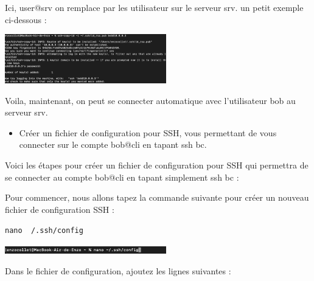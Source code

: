 \documentclass[12pt]{article}
\begin{document}
\vspace{0.3cm}

Ici, user@srv on remplace par les utilisateur sur le serveur srv. un petit exemple ci-dessous  : 

\vspace{0.3cm}

\begin{center}
  \includegraphics[width=7cm]{Image-TD-SSH-3/ssh-copy-id.png}
\end{center}

\vspace{0.3cm}

Voila, maintenant, on peut se connecter automatique avec l'utilisateur bob au serveur srv.

\vspace{0.3cm}

\begin{itemize}
  \item Créer un fichier de configuration pour SSH, vous permettant de vous connecter sur le compte bob@cli en tapant ssh bc.
\end{itemize}

\vspace{0.3cm}

Voici les étapes pour créer un fichier de configuration pour SSH qui permettra de se connecter au compte bob@cli en tapant simplement ssh bc :

\vspace{0.3cm}

Pour commencer, nous allons tapez la commande suivante pour créer un nouveau fichier de configuration SSH :

\texttt{nano ~/.ssh/config}

\vspace{0.3cm}

\begin{center}
  \includegraphics[width=7cm]{Image-TD-SSH-3/fichier-config.png}
\end{center}

\vspace{0.3cm}

Dans le fichier de configuration, ajoutez les lignes suivantes :
\end{document}
